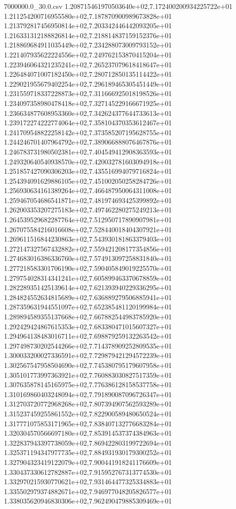 \begin{filecontents*}{7000000.0_30.0.csv}
1.208715461970503640e+02,7.172400200934225722e+01
1.211254200716955580e+02,7.187870900989673828e+01
1.213792817456950814e+02,7.203342446442093205e+01
1.216331312188826814e+02,7.218814837159152376e+01
1.218869684911035449e+02,7.234288073009793152e+01
1.221407935622224556e+02,7.249762153870415204e+01
1.223946064321235241e+02,7.265237079618418647e+01
1.226484071007182450e+02,7.280712850135114422e+01
1.229021955679402254e+02,7.296189465305451449e+01
1.231559718337228873e+02,7.311666925018198526e+01
1.234097358980478418e+02,7.327145229166671925e+01
1.236634877608953360e+02,7.342624377644733613e+01
1.239172274222774064e+02,7.358104370353612467e+01
1.241709548822258142e+02,7.373585207195628755e+01
1.244246701407964792e+02,7.389066888076467876e+01
1.246783731980502381e+02,7.404549412908363593e+01
1.249320640540938570e+02,7.420032781603094918e+01
1.251857427090306203e+02,7.435516994079716824e+01
1.254394091629886105e+02,7.451002050258284726e+01
1.256930634161389264e+02,7.466487950064311008e+01
1.259467054686541871e+02,7.481974693425399892e+01
1.262003353207275183e+02,7.497462280275249213e+01
1.264539529682287764e+02,7.512950717890907981e+01
1.267075584216016608e+02,7.528440018404307921e+01
1.269611516844230863e+02,7.543930181863379403e+01
1.272147327567432882e+02,7.559421208177354856e+01
1.274683016386336760e+02,7.574913097258831840e+01
1.277218583301706190e+02,7.590405849019225570e+01
1.279754028314341241e+02,7.605899463370678859e+01
1.282289351425139614e+02,7.621393940229336295e+01
1.284824552634815689e+02,7.636889279506885941e+01
1.287359631944551097e+02,7.652385481120199984e+01
1.289894589355137668e+02,7.667882544983785920e+01
1.292429424867615353e+02,7.683380471015607327e+01
1.294964138483016711e+02,7.698879259132263542e+01
1.297498730202544266e+02,7.714378909252809535e+01
1.300033200027336591e+02,7.729879421294572239e+01
1.302567547958504690e+02,7.745380795179607958e+01
1.305101773997363921e+02,7.760883030827517359e+01
1.307635878145165975e+02,7.776386128158537758e+01
1.310169860403248094e+02,7.791890087096726347e+01
1.312703720772968268e+02,7.807394907562593289e+01
1.315237459255861552e+02,7.822900589480650524e+01
1.317771075853171965e+02,7.838407132776683284e+01
1.320304570566697180e+02,7.853914537374384963e+01
1.322837943397738059e+02,7.869422803199722694e+01
1.325371194347977735e+02,7.884931930179300252e+01
1.327904323419122079e+02,7.900441918241176609e+01
1.330437330612782887e+02,7.915952767313774530e+01
1.332970215930770621e+02,7.931464477325334883e+01
1.335502979374882671e+02,7.946977048205826577e+01
1.338035620946830306e+02,7.962490479885309469e+01

\end{filecontents*}
